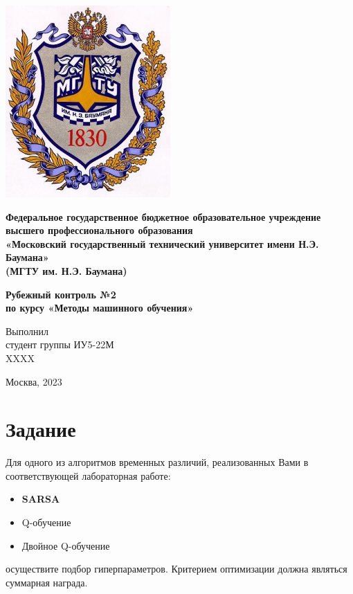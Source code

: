 \documentclass[a4paper]{article}
\begin{document}
  \fontsize{14}{16}\selectfont

  \begin{titlepage}
    \begin{minipage}{0.2\textwidth}
      \includegraphics[scale=0.4]{logo}
    \end{minipage}
    \begin{minipage}{0.7\textwidth}\centering
      \fontsize{10}{12}\selectfont
      \textbf{
        Федеральное государственное бюджетное образовательное учреждение \\
        высшего профессионального образования \\
        «Московский государственный технический университет имени Н.Э. Баумана» \\
        (МГТУ им. Н.Э. Баумана)
      }
    \end{minipage}

    \vspace{5cm}
    \centering
    \fontsize{16}{20}\textbf{
      Рубежный контроль №2 \\
      по курсу «Методы машинного обучения» \\
    }

    \vspace{5cm}
    \begin{flushright}
    Выполнил \\
    студент группы ИУ5-22М \\
    XXXX \\
    \end{flushright}
    \vspace*{\fill}
    Москва, 2023
  \end{titlepage}

  \justifying
  \setlength{\parindent}{1.25cm}

  \section{Задание}
  Для одного из алгоритмов временных различий, реализованных Вами в соответствующей лабораторная работе:
  \begin{itemize}
    \item \textbf{SARSA}
    \item Q-обучение
    \item Двойное Q-обучение
  \end{itemize}
  осуществите подбор гиперпараметров. Критерием оптимизации должна являться суммарная награда.
\end{document}
